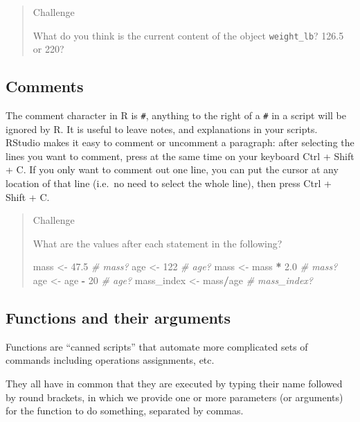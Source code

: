 \documentclass[]{book}
\newenvironment{Shaded}{\begin{snugshade}}{\end{snugshade}}
\newcommand{\DecValTok}[1]{\textcolor[rgb]{0.00,0.00,0.81}{#1}}
\newcommand{\FloatTok}[1]{\textcolor[rgb]{0.00,0.00,0.81}{#1}}
\newcommand{\StringTok}[1]{\textcolor[rgb]{0.31,0.60,0.02}{#1}}
\newcommand{\CommentTok}[1]{\textcolor[rgb]{0.56,0.35,0.01}{\textit{#1}}}
\newcommand{\OperatorTok}[1]{\textcolor[rgb]{0.81,0.36,0.00}{\textbf{#1}}}
\newcommand{\NormalTok}[1]{#1}
\theoremstyle{definition}
\theoremstyle{definition}
\theoremstyle{remark}
\begin{document}
\begin{quote}
Challenge

What do you think is the current content of the object
\texttt{weight\_lb}? 126.5 or 220?
\end{quote}

\subsection{Comments}\label{comments}

The comment character in R is \texttt{\#}, anything to the right of a
\texttt{\#} in a script will be ignored by R. It is useful to leave
notes, and explanations in your scripts. RStudio makes it easy to
comment or uncomment a paragraph: after selecting the lines you want to
comment, press at the same time on your keyboard Ctrl + Shift + C. If
you only want to comment out one line, you can put the cursor at any
location of that line (i.e.~no need to select the whole line), then
press Ctrl + Shift + C.

\begin{quote}
Challenge

What are the values after each statement in the following?

\begin{Shaded}
\begin{Highlighting}[]
\NormalTok{mass <-}\StringTok{ }\FloatTok{47.5}            \CommentTok{# mass?}
\NormalTok{age  <-}\StringTok{ }\DecValTok{122}             \CommentTok{# age?}
\NormalTok{mass <-}\StringTok{ }\NormalTok{mass }\OperatorTok{*}\StringTok{ }\FloatTok{2.0}      \CommentTok{# mass?}
\NormalTok{age  <-}\StringTok{ }\NormalTok{age }\OperatorTok{-}\StringTok{ }\DecValTok{20}        \CommentTok{# age?}
\NormalTok{mass_index <-}\StringTok{ }\NormalTok{mass}\OperatorTok{/}\NormalTok{age  }\CommentTok{# mass_index?}
\end{Highlighting}
\end{Shaded}
\end{quote}

\subsection{Functions and their
arguments}\label{functions-and-their-arguments}

Functions are ``canned scripts'' that automate more complicated sets of
commands including operations assignments, etc.

They all have in common that they are executed by typing their name
followed by round brackets, in which we provide one or more parameters
(or arguments) for the function to do something, separated by commas.
\end{document}

